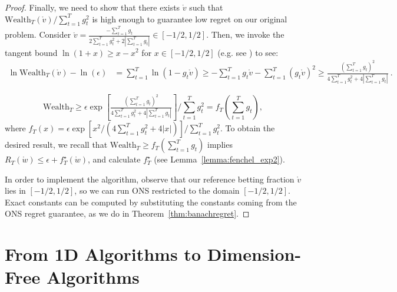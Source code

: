 \documentclass[12pt]{colt2018} %
\newcommand{\wealth}{\text{Wealth}}
\newcommand{\w}{\mathring{w}}
\renewcommand{\v}{\mathring{v}}
\begin{document}
\begin{proof}
Finally, we need to show that there exists $\v$ such that $\wealth_T(\v)/\sum_{t=1}^T g_t^2$ is high enough to guarantee low regret on our original problem. Consider $\v = \tfrac{-\sum_{t=1}^T g_t}{2\sum_{t=1}^T g_t^2 + 2\left|\sum_{t=1}^T g_t\right|}\in[-1/2,1/2]$. Then, we invoke the tangent bound $\ln(1+x)\ge x-x^2$ for $x\in[-1/2,1/2]$ (e.g. see \citep{cesa2006prediction}) to see:
\begin{align*}
\ln \wealth_T(\v)-\ln(\epsilon)
&=\sum_{t=1}^T \ln(1 - g_t \v )
\ge -\sum_{t=1}^T g_t\v-\sum_{t=1}^T ( g_t \v )^2
\ge\tfrac{\left(\sum_{t=1}^T g_t\right)^2}{4\sum_{t=1}^T g_t^2 + 4\left|\sum_{t=1}^T g_t\right|}~.
\end{align*}
\begin{comment}
Consider $\v = \tfrac{-\sum_{t=1}^T g_t}{2\sum_{t=1}^T g_t^2 + 2\left|\sum_{t=1}^T g_t\right|}$. Clearly $|\v|\le 1/2$, and the above equation implies
\[
\ln \wealth_T(\v) 
\ge \ln(\epsilon)+\tfrac{\left(\sum_{t=1}^T g_t\right)^2}{4\sum_{t=1}^T g_t^2 + 4\left|\sum_{t=1}^T g_t\right|}~.
\]
\end{comment}
\[
\wealth_T 
\ge \epsilon \exp\left[\tfrac{\left(\sum_{t=1}^T g_t\right)^2}{4\sum_{t=1}^T g_t^2 + 4\left|\sum_{t=1}^T g_t\right|}\right] \bigg/ \sum_{t=1}^T g_t^2
=f_T\left(\sum_{t=1}^T g_t\right),
\]
where $f_T(x) = \epsilon\exp[x^2/(4\sum_{t=1}^T g_t^2 + 4|x|)]/\sum_{t=1}^T g_t^2$. To obtain the desired result, we recall that $\wealth_T\ge f_T\left(\sum_{t=1}^T g_t\right)$ implies $R_T(\w)\le \epsilon + f_T^\star(\w)$, and calculate $f_T^\star$ (see Lemma~\ref{lemma:fenchel_exp2}).

In order to implement the algorithm, observe that our reference betting fraction $\v$ lies in $[-1/2,1/2]$, so we can run ONS restricted to the domain $[-1/2,1/2]$. Exact constants can be computed by substituting the constants coming from the ONS regret guarantee, as we do in Theorem~\ref{thm:banachregret}.
\end{proof}
\vspace{-0.3cm}
\section{From 1D Algorithms to Dimension-Free Algorithms}\label{sec:1dred}
\end{document}
